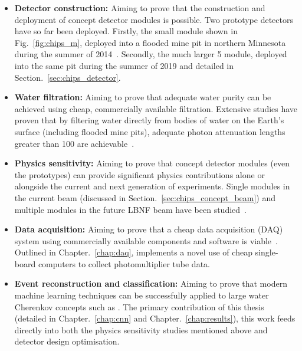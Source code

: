 \begin{itemize}
    \item \textbf{Detector construction:} Aiming to prove that the construction and deployment of
          \chips concept detector modules is possible. Two prototype detectors have so far been
          deployed. Firstly, the small \chipsm module shown in Fig.~\ref{fig:chips_m}, deployed
          into a flooded mine pit in northern Minnesota during the summer of 2014~\cite{perch2015,
              pfutznerProto2017, pfutzner2017}. Secondly, the much larger \unit{5}{}
          \chipsfive module, deployed into the same pit during the summer of 2019 and detailed in
          Section.~\ref{sec:chips_detector}.

    \item \textbf{Water filtration:} Aiming to prove that adequate water purity can be achieved
          using cheap, commercially available filtration. Extensive studies have proven that by
          filtering water directly from bodies of water on the Earth's surface (including flooded
          mine pits), adequate photon attenuation lengths greater than \unit{100}{} are
          achievable~\cite{amat2017, campbell2020}.

    \item \textbf{Physics sensitivity:} Aiming to prove that \chips concept detector modules (even
          the prototypes) can provide significant physics contributions alone or alongside the
          current and next generation of experiments. Single modules in the current \numi beam
          (discussed in Section.~\ref{sec:chips_concept_beam}) and multiple modules in the future
          LBNF beam have been studied~\cite{pfutzner2017, adde2016, lang2015}.

    \item \textbf{Data acquisition:} Aiming to prove that a cheap data acquisition (DAQ) system
          using commercially available components and software is viable~\cite{eijk2018}. Outlined
          in Chapter.~\ref{chap:daq}, \chips implements a novel use of cheap single-board
          computers to collect photomultiplier tube data.

    \item \textbf{Event reconstruction and classification:} Aiming to prove that modern machine
          learning techniques can be successfully applied to large water Cherenkov concepts such
          as \chips. The primary contribution of this thesis (detailed in Chapter.~\ref{chap:cnn}
          and Chapter.~\ref{chap:results}), this work feeds directly into both the physics
          sensitivity studies mentioned above and detector design optimisation.
\end{itemize}

